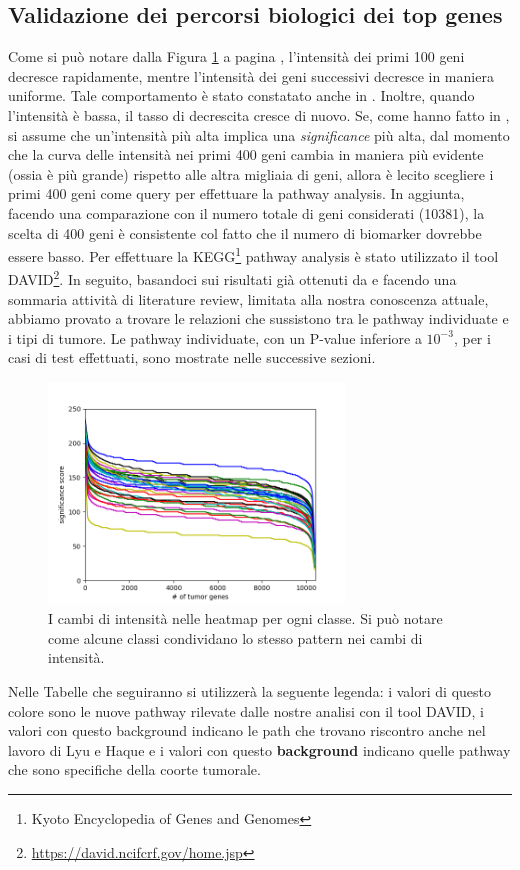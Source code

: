 \subsection{Validazione dei percorsi biologici dei top genes}
\label{ssec:val-bio-net}
Come si può notare dalla Figura \ref{fig:confidence-score-Net} a pagina \pageref{fig:confidence-score-Net}, 
l'intensità dei primi 100 geni decresce rapidamente, mentre l'intensità dei geni successivi decresce in maniera 
uniforme. Tale comportamento è stato constatato anche in \cite{lyu2018deep}. Inoltre, quando
l'intensità è bassa, il tasso di decrescita cresce di nuovo. Se, come hanno fatto in \cite{lyu2018deep}, si assume 
che un'intensità più alta implica una \textit{significance} più alta, dal momento che la curva delle intensità nei
primi 400 geni cambia in maniera più evidente (ossia è più grande) rispetto alle altra migliaia di geni, allora 
è lecito scegliere i primi 400 geni come query per effettuare la pathway analysis. In aggiunta, facendo una
comparazione con il numero totale di geni considerati (10381), la scelta di 400 geni è 
consistente col fatto che il numero di biomarker dovrebbe essere basso. Per effettuare la KEGG\footnote{Kyoto
Encyclopedia of Genes and Genomes} pathway analysis è stato utilizzato il tool
DAVID\footnote{\url{https://david.ncifcrf.gov/home.jsp}}.
In seguito, basandoci sui risultati già ottenuti da \cite{lyu2018deep} e facendo una sommaria attività di 
literature review, limitata alla nostra conoscenza attuale, abbiamo provato a trovare le relazioni che sussistono 
tra le pathway individuate e i tipi di tumore. Le pathway individuate, con un P-value inferiore a $10^{-3}$, per 
i casi di test effettuati, sono mostrate nelle successive sezioni.
\begin{figure}
    \centering
    \includegraphics[width=0.7\textwidth]{images/confidence-score/ConfidenceScore-plot-Net.png}
    \caption{I cambi di intensità nelle heatmap per ogni classe. Si può notare come alcune classi condividano lo stesso pattern nei
    cambi di intensità.}
    \label{fig:confidence-score-Net}
\end{figure}
Nelle Tabelle che seguiranno si utilizzerà la seguente legenda: i valori di questo \textcolor{\clrnew}{colore} 
sono le nuove pathway rilevate dalle nostre analisi con il tool DAVID, i valori con questo 
\colorbox{\clrmatch}{background} indicano le path che trovano riscontro anche nel lavoro di Lyu e Haque
\cite{lyu2018deep} e i valori con questo \colorbox{\clrpath}{\textbf{background}} indicano quelle pathway che 
sono specifiche della coorte tumorale.
